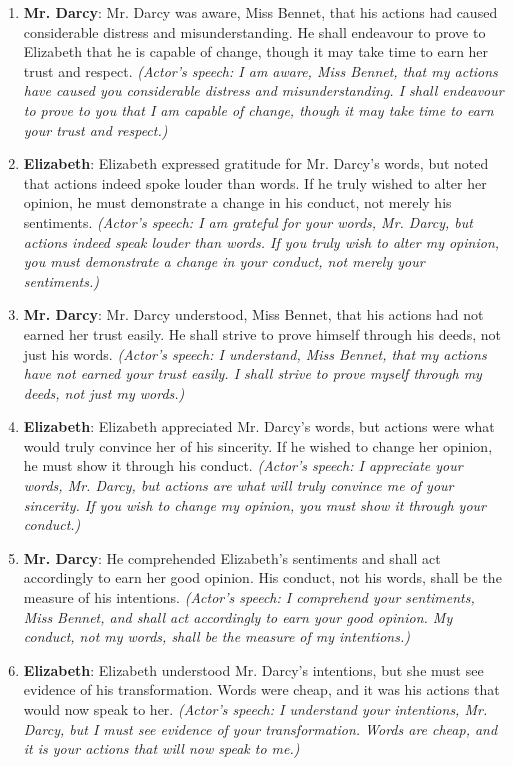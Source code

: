 \documentclass[10pt]{article}
\begin{document}
\begin{enumerate}
\item \textbf{Mr. Darcy}: Mr. Darcy was aware, Miss Bennet, that his actions had caused considerable distress and misunderstanding. He shall endeavour to prove to Elizabeth that he is capable of change, though it may take time to earn her trust and respect. \emph{(Actor's speech: I am aware, Miss Bennet, that my actions have caused you considerable distress and misunderstanding. I shall endeavour to prove to you that I am capable of change, though it may take time to earn your trust and respect.)}

\item \textbf{Elizabeth}: Elizabeth expressed gratitude for Mr. Darcy's words, but noted that actions indeed spoke louder than words. If he truly wished to alter her opinion, he must demonstrate a change in his conduct, not merely his sentiments. \emph{(Actor's speech: I am grateful for your words, Mr. Darcy, but actions indeed speak louder than words. If you truly wish to alter my opinion, you must demonstrate a change in your conduct, not merely your sentiments.)}

\item \textbf{Mr. Darcy}: Mr. Darcy understood, Miss Bennet, that his actions had not earned her trust easily. He shall strive to prove himself through his deeds, not just his words. \emph{(Actor's speech: I understand, Miss Bennet, that my actions have not earned your trust easily. I shall strive to prove myself through my deeds, not just my words.)}

\item \textbf{Elizabeth}: Elizabeth appreciated Mr. Darcy's words, but actions were what would truly convince her of his sincerity. If he wished to change her opinion, he must show it through his conduct. \emph{(Actor's speech: I appreciate your words, Mr. Darcy, but actions are what will truly convince me of your sincerity. If you wish to change my opinion, you must show it through your conduct.)}

\item \textbf{Mr. Darcy}: He comprehended Elizabeth's sentiments and shall act accordingly to earn her good opinion. His conduct, not his words, shall be the measure of his intentions. \emph{(Actor's speech: I comprehend your sentiments, Miss Bennet, and shall act accordingly to earn your good opinion. My conduct, not my words, shall be the measure of my intentions.)}

\item \textbf{Elizabeth}: Elizabeth understood Mr. Darcy's intentions, but she must see evidence of his transformation. Words were cheap, and it was his actions that would now speak to her. \emph{(Actor's speech: I understand your intentions, Mr. Darcy, but I must see evidence of your transformation. Words are cheap, and it is your actions that will now speak to me.)}


\end{enumerate}
\end{document}
